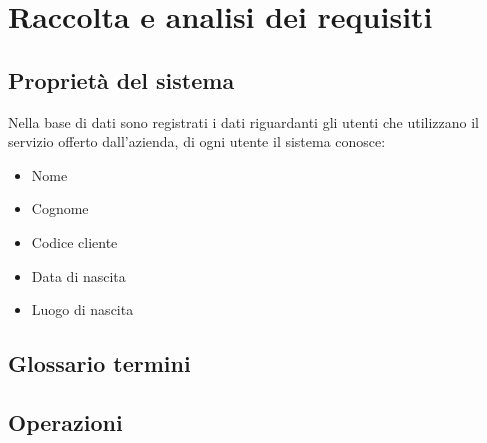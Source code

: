 \section{Raccolta e analisi dei requisiti}
\subsection{Proprietà del sistema}
Nella base di dati sono registrati i dati riguardanti gli utenti che utilizzano il servizio offerto dall'azienda, di ogni utente il sistema conosce:
\begin{multicols}{2}
    \begin{itemize}
        \item Nome
        \item Cognome
        \item Codice cliente
        \item Data di nascita
        \item Luogo di nascita
    \end{itemize}
\end{multicols}

\subsection{Glossario termini}
\subsection{Operazioni}
